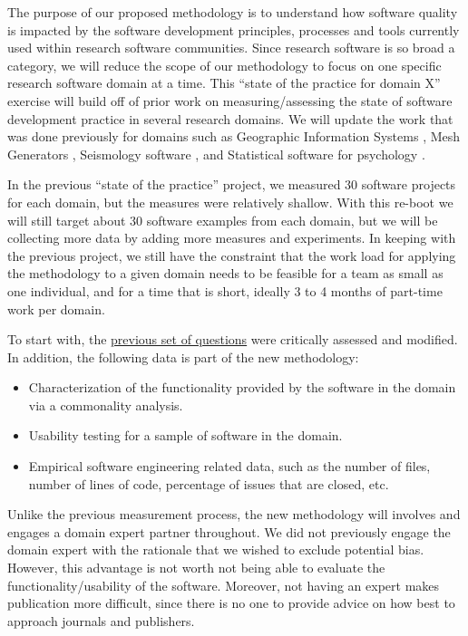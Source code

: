 \documentclass[letterpaper,cleveref]{lipics-v2019}
\theoremstyle{definition}
\begin{document}
The purpose of our proposed methodology is to understand how software quality is
impacted by the software development principles, processes and tools currently
used within research software communities.  Since research software is so broad
a category, we will reduce the scope of our methodology to focus on one specific
research software domain at a time.  This ``state of the practice for domain X''
exercise will build off of prior work on measuring/assessing the state of
software development practice in several research domains.  We will update the
work that was done previously for domains such as Geographic Information Systems
\citep{SmithEtAl2018_arXivGIS}, Mesh Generators \citep{SmithEtAl2016},
Seismology software \citep{SmithEtAl2018}, and Statistical software for
psychology \citep{SmithEtAl2018_StatSoft}.

In the previous ``state of the practice'' project, we measured 30 software
projects for each domain, but the measures were relatively shallow.  With this
re-boot we will still target about 30 software examples from each domain, but we
will be collecting more data by adding more measures and experiments.  In
keeping with the previous project, we still have the constraint that the work
load for applying the methodology to a given domain needs to be feasible for a
team as small as one individual, and for a time that is short, ideally 3 to 4
months of part-time work per domain.

To start with, the 
\href{https://github.com/adamlazz/DomainX/blob/master/TemplateToGradeSCSoft.pdf}
{previous set of questions} were critically assessed and modified.  In addition,
the following data is part of the new methodology:

\begin{itemize}
\item Characterization of the functionality provided by the software in the
  domain via a commonality analysis.
\item Usability testing for a sample of software in the domain.
\item Empirical software engineering related data, such as the number of
  files, number of lines of code, percentage of issues that are closed, etc. 
\end{itemize}

Unlike the previous measurement process, the new methodology will involves and
engages a domain expert partner throughout.  We did not previously engage the
domain expert with the rationale that we wished to exclude potential bias.
However, this advantage is not worth not being able to evaluate the
functionality/usability of the software.  Moreover, not having an expert makes
publication more difficult, since there is no one to provide advice on how best
to approach journals and publishers.
\end{document}
